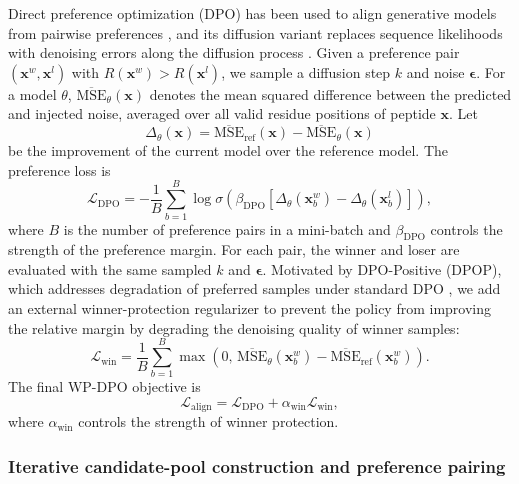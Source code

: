\begin{methods}
Direct preference optimization (DPO) has been used to align generative models from pairwise preferences \citep{ref_dpo}, and its diffusion variant replaces sequence likelihoods with denoising errors along the diffusion process \citep{ref_diffusion_dpo}.
Given a preference pair $(\mathbf{x}^{w},\mathbf{x}^{l})$ with $R(\mathbf{x}^{w})>R(\mathbf{x}^{l})$, we sample a diffusion step $k$ and noise $\boldsymbol{\epsilon}$.
For a model $\theta$, $\overline{\mathrm{MSE}}_{\theta}(\mathbf{x})$ denotes the mean squared difference between the predicted and injected noise, averaged over all valid residue positions of peptide $\mathbf{x}$.
Let
\begin{equation}
\Delta_{\theta}(\mathbf{x})
=\overline{\mathrm{MSE}}_{\mathrm{ref}}(\mathbf{x})
-\overline{\mathrm{MSE}}_{\theta}(\mathbf{x})
\label{eq:dpo_delta}
\end{equation}
be the improvement of the current model over the reference model.
The preference loss is
\begin{equation}
\mathcal{L}_{\mathrm{DPO}}
=-\frac{1}{B}\sum_{b=1}^{B}
\log\sigma\!\left(
\beta_{\mathrm{DPO}}
\left[
\Delta_{\theta}(\mathbf{x}_{b}^{w})
-\Delta_{\theta}(\mathbf{x}_{b}^{l})
\right]\right),
\label{eq:dpo_loss}
\end{equation}
where $B$ is the number of preference pairs in a mini-batch and $\beta_{\mathrm{DPO}}$ controls the strength of the preference margin.
For each pair, the winner and loser are evaluated with the same sampled $k$ and $\boldsymbol{\epsilon}$.
Motivated by DPO-Positive (DPOP), which addresses degradation of preferred samples under standard DPO \citep{ref_dpop}, we add an external winner-protection regularizer to prevent the policy from improving the relative margin by degrading the denoising quality of winner samples:
\begin{equation}
\mathcal{L}_{\mathrm{win}}
=\frac{1}{B}\sum_{b=1}^{B}
\max\left(
0,\,
\overline{\mathrm{MSE}}_{\theta}(\mathbf{x}_{b}^{w})
-
\overline{\mathrm{MSE}}_{\mathrm{ref}}(\mathbf{x}_{b}^{w})
\right).
\label{eq:winner_reg}
\end{equation}
The final WP-DPO objective is
\begin{equation}
\mathcal{L}_{\mathrm{align}}
=\mathcal{L}_{\mathrm{DPO}}
+\alpha_{\mathrm{win}}\mathcal{L}_{\mathrm{win}},
\label{eq:dpo_total_loss}
\end{equation}
where $\alpha_{\mathrm{win}}$ controls the strength of winner protection.

\subsubsection{Iterative candidate-pool construction and preference pairing}\label{subsubsec:pairing}


\end{methods}
